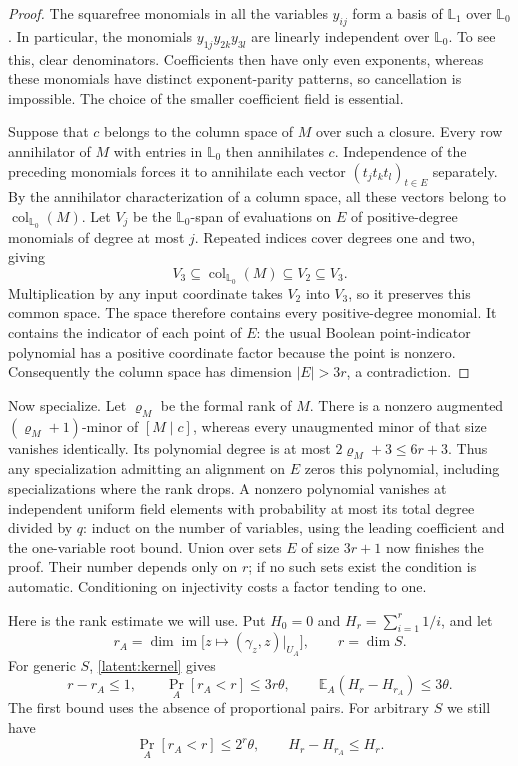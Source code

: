 \documentclass[11pt]{article}
\newcommand{\E}{\mathbb E}
\begin{document}
\begin{proof}
The squarefree monomials in all the variables $y_{ij}$ form a basis of
$\mathbb L_1$ over $\mathbb L_0$. In particular, the monomials
$y_{1j}y_{2k}y_{3l}$ are linearly independent over $\mathbb L_0$.
To see this, clear denominators. Coefficients then have only even
exponents, whereas these monomials have distinct exponent-parity
patterns, so cancellation is impossible. The choice of the smaller
coefficient field is essential.

Suppose that $c$ belongs to the column space of $M$ over such a closure.
Every row annihilator of $M$ with entries in
$\mathbb L_0$ then annihilates $c$. Independence of the preceding monomials
forces it to annihilate each vector $(t_jt_kt_l)_{t\in E}$ separately.
By the annihilator characterization of a column space, all these
vectors belong to $\operatorname{col}_{\mathbb L_0}(M)$.
Let $V_j$ be the $\mathbb L_0$-span of evaluations on $E$ of positive-degree
monomials of degree at most $j$. Repeated indices cover degrees one
and two, giving
\[
 V_3\subseteq\operatorname{col}_{\mathbb L_0}(M)\subseteq V_2\subseteq V_3.
\]
Multiplication by any input coordinate takes $V_2$ into $V_3$, so it
preserves this common space. The space therefore contains every
positive-degree monomial. It contains the indicator of each point of
$E$: the usual Boolean point-indicator polynomial has a positive
coordinate factor because the point is nonzero. Consequently the
column space has dimension $|E|>3r$, a contradiction.
\end{proof}

\noindent Now specialize.
Let $\varrho_M$ be the formal rank of $M$. There is a nonzero augmented
$(\varrho_M+1)$-minor of $[M\mid c]$, whereas every unaugmented minor of that
size vanishes identically. Its polynomial degree is at most
$2\varrho_M+3\le6r+3$. Thus any specialization admitting an alignment on $E$
zeros this polynomial, including specializations where the rank drops.
A nonzero polynomial vanishes at independent uniform field elements
with probability at most its total degree divided by $q$: induct on the
number of variables, using the leading coefficient and the
one-variable root bound. Union over sets $E$ of size $3r+1$ now
finishes the proof. Their number depends only on $r$; if no such sets
exist the condition is automatic. Conditioning on injectivity costs a
factor tending to one.

Here is the rank estimate we will use. Put $H_0=0$ and
$H_r=\sum_{i=1}^r1/i$, and let
\[
 r_A=\dim\operatorname{im}\bigl[z\mapsto(\gamma_z,z)|_{U_A}\bigr],
 \qquad r=\dim S.
\]
For generic $S$, \eqref{latent:kernel} gives
\begin{equation}
 r-r_A\le1,\qquad
 \Pr_A[r_A<r]\le3r\theta,\qquad
 \E_A(H_r-H_{r_A})\le3\theta.
 \label{latent:good-loss}
\end{equation}
The first bound uses the absence of proportional pairs. For arbitrary
$S$ we still have
\begin{equation}
 \Pr_A[r_A<r]\le2^r\theta,\qquad H_r-H_{r_A}\le H_r.
 \label{latent:arbitrary-loss}
\end{equation}
\end{document}
